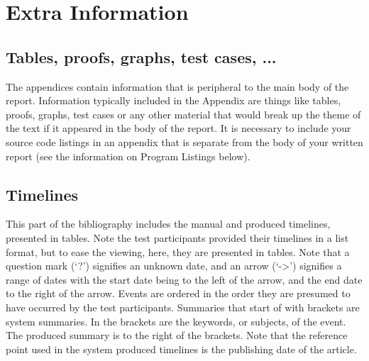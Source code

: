 \chapter{Extra Information}
\section{Tables, proofs, graphs, test cases, ...}
The appendices contain information that is peripheral to the main body of the report. Information typically included in the Appendix are things like tables, proofs, graphs, test cases or any other material that would break up the theme of the text if it appeared in the body of the report. It is necessary to include your source code listings in an appendix that is separate from the body of your written report (see the information on Program Listings below).

\section{Timelines}
\par This part of the bibliography includes the manual and produced timelines, presented in tables. Note the test participants provided their timelines in a list format, but to ease the viewing, here, they are presented in tables. Note that a question mark (`?') signifies an unknown date, and an arrow (`->') signifies a range of dates with the start date being to the left of the arrow, and the end date to the right of the arrow. Events are ordered in the order they are presumed to have occurred by the test participants. Summaries that start of with brackets are system summaries. In the brackets are the keywords, or subjects, of the event. The produced summary is to the right of the brackets. Note that the reference point used in the system produced timelines is the publishing date of the article.
